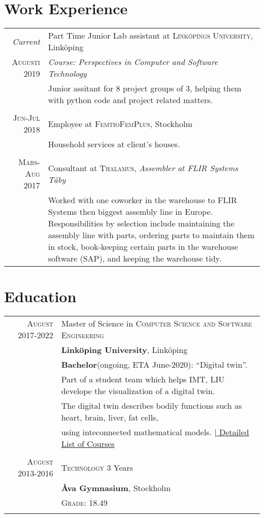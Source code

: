 \documentclass[a4paper,10pt]{article}
\begin{document}
\section{Work Experience}
\begin{tabular}{r|p{11cm}}
 \emph{Current} & Part Time Junior Lab assistant at \textsc{Linköpings University}, Linköping \\\textsc{Augusti 2019}&
          \emph{Course: Perspectives in Computer and Software Technology}\\&\footnotesize{Junior assitant for 8 project groups of 3, helping them with python code and project related matters.}\\\multicolumn{2}{c}{} \\
 \textsc{Jun-Jul 2018} & Employee at \textsc{FemtioFemPlus}, Stockholm \\&\footnotesize{Household services at client's houses.} \\\multicolumn{2}{c}{} \\
\textsc{Mars-Aug 2017} & Consultant at \textsc{Thalamus}, \emph{Assembler at FLIR Systems Täby}\\&\footnotesize{Worked with one coworker in the warehouse to FLIR Systems then biggest assembly line in Europe. 
                                                                Responsibilities by selection include maintaining the assembly line with parts, ordering parts to maintain them in stock, book-keeping certain parts in the warehouse software (SAP), and keeping the warehouse tidy.}
\end{tabular}
\section{Education}
\begin{tabular}{rl}	
 \textsc{August} 2017-2022 & Master of Science in \textsc{Computer Science and Software Engineering} \\& \textbf{Linköping University}, Linköping\\
& \textbf{Bachelor}(ongoing, ETA June-2020): ``Digital twin''. \\
&\footnotesize Part of a student team which helps IMT, LIU develope the visualization of a digital twin. \\&\footnotesize The digital twin describes bodily functions such as heart, brain, liver, fat cells,\\&\footnotesize  using inteconnected mathematical models. \hyperlink{grds_liu}{\hfill| \footnotesize Detailed List of Courses} \\\\
\textsc{August} 2013-2016& \textsc{Technology} 3 Years \\& \normalsize\textbf{Åva Gymnasium}, Stockholm\\
&\normalsize \textsc{Grade}: 18.49\\&\\

\end{tabular}
\end{document}
